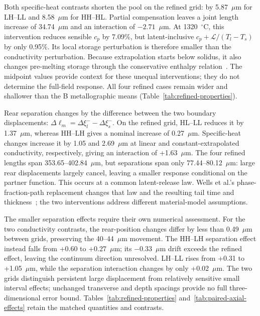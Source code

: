 \documentclass[preprint,12pt]{elsarticle}
\newcommand{\um}{\ensuremath{\mu\mathrm{m}}}
\begin{document}
Both specific-heat contrasts shorten the pool on the refined grid: by 5.87~\um{} for LH--LL and 8.58~\um{} for HH--HL. Partial compensation leaves a joint length increase of 34.74~\um{} and an interaction of $-2.71$~\um. At 1320~$^\circ$C, this intervention reduces sensible $c_p$ by 7.09\%, but latent-inclusive $c_p+\mathcal L/(T_l-T_s)$ by only 0.95\%. Its local storage perturbation is therefore smaller than the conductivity perturbation. Because extrapolation starts below solidus, it also changes pre-melting storage through the conservative enthalpy relation~\cite{vanelsen2007}. The midpoint values provide context for these unequal interventions; they do not determine the full-field response. All four refined cases remain wider and shallower than the B metallographic means (Table~\ref{tab:refined-properties}).

Rear separation changes by the difference between the two boundary displacements: $\Delta\ell_m=\Delta\xi_l^- -\Delta\xi_s^-$. On the refined grid, HL--LL reduces it by 1.37~\um{}, whereas HH--LH gives a nominal increase of 0.27~\um. Specific-heat changes increase it by 1.05 and 2.69~\um{} at linear and constant-extrapolated conductivity, respectively, giving an interaction of +1.63~\um. The four refined lengths span 353.65--402.84~\um{}, but separations span only 77.44--80.12~\um{}: large rear displacements largely cancel, leaving a smaller response conditional on the partner function. This occurs at a common latent-release law. Wells et al.'s phase-fraction-path replacement changes that law and the resulting tail time and thickness~\cite{solidpath2024}; the two interventions address different material-model assumptions.

The smaller separation effects require their own numerical assessment. For the two conductivity contrasts, the rear-position changes differ by less than 0.49~\um{} between grids, preserving the 40--44~\um{} movement. The HH--LH separation effect instead falls from +0.60 to +0.27~\um{}; its $-0.33$~\um{} drift exceeds the refined effect, leaving the continuum direction unresolved. LH--LL rises from +0.31 to +1.05~\um{}, while the separation interaction changes by only +0.02~\um. The two grids distinguish persistent large displacement from relatively sensitive small interval effects; unchanged transverse and depth spacings provide no full three-dimensional error bound. Tables~\ref{tab:refined-properties} and~\ref{tab:paired-axial-effects} retain the matched quantities and contrasts.
\end{document}
